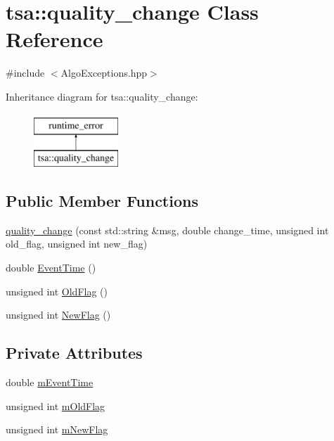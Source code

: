 \hypertarget{classtsa_1_1quality__change}{}\section{tsa\+:\+:quality\+\_\+change Class Reference}
\label{classtsa_1_1quality__change}


{\ttfamily \#include $<$Algo\+Exceptions.\+hpp$>$}

Inheritance diagram for tsa\+:\+:quality\+\_\+change\+:\begin{figure}[H]
\begin{center}
\leavevmode
\includegraphics[height=2.000000cm]{classtsa_1_1quality__change}
\end{center}
\end{figure}
\subsection*{Public Member Functions}
\begin{DoxyCompactItemize}
\item 
\hyperlink{classtsa_1_1quality__change_af530cc58e7eeb50f31ddb700bfea79f4}{quality\+\_\+change} (const std\+::string \&msg, double change\+\_\+time, unsigned int old\+\_\+flag, unsigned int new\+\_\+flag)
\item 
double \hyperlink{classtsa_1_1quality__change_a71190c89b87f044b190e67be16f4c1a4}{Event\+Time} ()
\item 
unsigned int \hyperlink{classtsa_1_1quality__change_af1f74fabce5ad05c2088a7e99a68cb6a}{Old\+Flag} ()
\item 
unsigned int \hyperlink{classtsa_1_1quality__change_a6de5d5aea1cf03c5d4d2d69014d78d2d}{New\+Flag} ()
\end{DoxyCompactItemize}
\subsection*{Private Attributes}
\begin{DoxyCompactItemize}
\item 
double \hyperlink{classtsa_1_1quality__change_a5bbdd6247455082169c25acf8c092186}{m\+Event\+Time}
\item 
unsigned int \hyperlink{classtsa_1_1quality__change_aca073076da85ec9eab1fa6d9b7e99a2b}{m\+Old\+Flag}
\item 
unsigned int \hyperlink{classtsa_1_1quality__change_a90e75c508ba37e01d11727853e401919}{m\+New\+Flag}
\end{DoxyCompactItemize}


